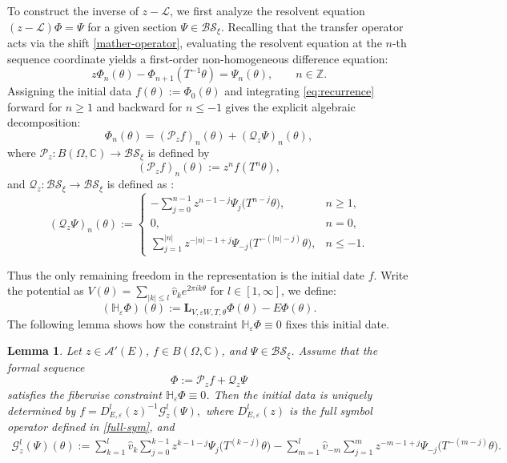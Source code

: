 \documentclass[reqno,11pt]{amsart}
\newtheorem{lemma}{Lemma}[section]
\newcommand{\Z}{{\mathbb Z}}
\newcommand{\C}{{\mathbb C}}
\begin{document}
To construct the inverse of $z-\mathcal{L}$, we  first analyze the resolvent equation $(z-\mathcal{L})\Phi = \Psi$ for a given section $\Psi \in \mathcal{BS}_\xi$. Recalling that the transfer operator acts via the shift \eqref{mather-operator}, evaluating the resolvent equation at the $n$-th sequence coordinate yields a first-order non-homogeneous difference equation:
\begin{equation}\label{eq:recurrence}z\Phi_n(\theta) - \Phi_{n+1}(T^{-1}\theta) = \Psi_n(\theta), \qquad n \in \Z.\end{equation}
Assigning the initial data $f(\theta) := \Phi_0(\theta)$ and integrating \eqref{eq:recurrence} forward for $n \ge 1$ and backward for $n \le -1$ gives the explicit algebraic decomposition:
$$\Phi_n(\theta) = (\mathcal{P}_z f)_n(\theta) + (\mathcal{Q}_z\Psi)_n(\theta),$$
where  $\mathcal{P}_z: B(\Omega, \C) \to \mathcal{BS}_\xi$ is defined by
\begin{equation}\label{eq:Kz-def}(\mathcal{P}_z f)_n(\theta) := z^n f(T^n\theta),
\end{equation}
and  $\mathcal{Q}_z: \mathcal{BS}_\xi \to \mathcal{BS}_\xi$ is defined as :
\begin{equation}\label{eq:Qz-def}
(\mathcal{Q}_z\Psi)_n(\theta) :=
\begin{cases}
-\displaystyle\sum_{j=0}^{n-1} z^{n-1-j}\Psi_j\bigl(T^{n-j}\theta\bigr), & n\ge 1,\\
0, & n=0,\\
\displaystyle\sum_{j=1}^{|n|} z^{-|n|-1+j}\Psi_{-j}\bigl(T^{-(|n|-j)}\theta\bigr), & n \le -1.
\end{cases}
\end{equation}

Thus the only remaining freedom in the representation is the initial date $f$. 
Write  the potential as  $V(\theta) = \sum_{|k|\le l} \hat{v}_k e^{2\pi i k\theta}$ for $l \in [1, \infty]$, we define:
$$(\mathbb{H}_\varepsilon\Phi)(\theta) := \mathbf{L}_{V,\varepsilon W,T,\theta}\Phi(\theta) - E\Phi(\theta).$$ The following lemma shows how the constraint
$\mathbb H_\varepsilon\Phi\equiv0$ fixes this initial date.

\begin{lemma}\label{lem:zeroth} 
  Let $z \in \mathcal{A}'(E)$, $f\in B(\Omega,\mathbb C)$, and $\Psi\in\mathcal{BS}_\xi$. Assume that the formal sequence$$\Phi := \mathcal P_z f + \mathcal Q_z\Psi$$  satisfies the fiberwise constraint $\mathbb H_\varepsilon\Phi \equiv 0$. Then the initial data is uniquely determined by $f = D^l_{E,\varepsilon}(z)^{-1}\mathcal G_z^l(\Psi),$
  where $D^l_{E,\varepsilon}(z) $ is the full symbol operator  defined  in   \eqref{full-sym}, and 
  $$\begin{aligned}
\mathcal{G}_z^l(\Psi)(\theta) := \sum_{k=1}^l \hat{v}_k \sum_{j=0}^{k-1} z^{k-1-j}\Psi_j\bigl(T^{(k-j)}\theta\bigr) 
- \sum_{m=1}^l \hat v_{-m}\sum_{j=1}^{m} z^{-m-1+j}\Psi_{-j}\bigl(T^{-(m-j)}\theta\bigr).
\end{aligned}$$
\end{lemma}
\end{document}
